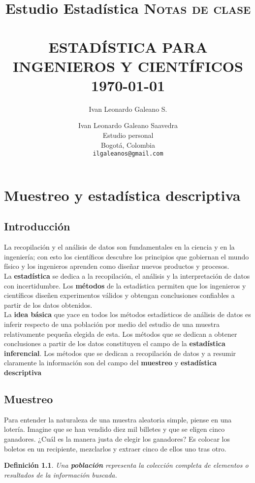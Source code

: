 \documentclass[10pt,a4paper]{book}
\author{Ivan Leonardo Galeano S.}
\title{Estudio Estadística}
\title{	\normalsize \textsc{Notas de clase} 	%
	\\[2.0cm]													%
	\HRule{0.5pt} \\										%
	\LARGE \textbf{\uppercase{Estadística para ingenieros y científicos}}	%
	\HRule{2pt} \\ [0.5cm]								%
	\normalsize \today									%
}
\author{
	Ivan Leonardo Galeano Saavedra\\	
	Estudio personal\\	
	Bogotá, Colombia\\
	\texttt{ilgaleanos@gmail.com} \\
}
\makeatletter
\newtheorem{defi}{\textbf{Definición}}
\def\printtitle{%
	{\centering \@title\par}}
\def\printauthor{%
	{\centering \large \@author}}
\makeatother
\begin{document}
\thispagestyle{empty}
\printtitle
\vfill
\printauthor

\chapter{Muestreo y estadística descriptiva}

\section*{Introducción}

La recopilación y el análisis de datos son fundamentales en la ciencia y en la ingeniería; con esto los científicos descubre los principios que gobiernan el mundo físico y los ingenieros aprenden como diseñar nuevos productos y procesos.\\

La \textbf{estadística} se dedica a la recopilación, el análisis y la interpretación de datos con incertidumbre. Los \textbf{métodos} de la estadística permiten que los ingenieros y científicos diseñen experimentos válidos y obtengan conclusiones confiables a partir de los datos obtenidos.\\

La \textbf{idea básica} que yace en todos los métodos estadísticos de análisis de datos es inferir respecto de una población por medio del estudio de una muestra relativamente pequeña elegida de esta. Los métodos que se dedican a obtener conclusiones a partir de los datos constituyen el campo de la \textbf{estadística inferencial}. Los métodos que se dedican a recopilación de datos y a resumir claramente la información son del campo del \textbf{muestreo} y \textbf{estadística descriptiva}


\section{Muestreo}

Para entender la naturaleza de una muestra aleatoria simple, piense en una lotería. Imagine que se han vendido diez mil billetes y que se eligen cinco ganadores. ¿Cuál es la manera justa de elegir los ganadores? Es colocar los boletos en un recipiente, mezclarlos y extraer cinco de ellos uno tras otro.

\begin{defi}
	Una \textbf{población} representa la colección completa de elementos o resultados de la información buscada.
\end{defi}
\end{document}
